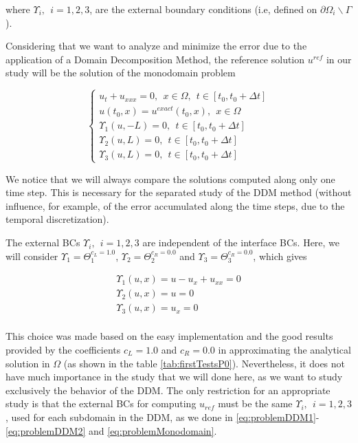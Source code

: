 \noindent where $ \Upsilon_i, \ \ i=1,2,3$, are the external boundary conditions (i.e, defined on $\partial \Omega_i \backslash \Gamma$).

\indent Considering that we want to analyze and minimize the error due to the application of a Domain Decomposition Method, the reference solution $u^{ref}$ in our study will be the solution of the monodomain problem

\begin{equation}
	\label{eq:problemMonodomain}
	\begin{cases}
	u_t + u_{xxx} = 0, \ \ x \in \Omega, \ \ t \in [t_0, t_0+\Delta t] \\
	u(t_0,x) = u^{exact}(t_0,x) , \ \ x \in \Omega \\ 
	\Upsilon_1(u,-L) = 0, \ \ t \in [t_0, t_0+\Delta t] \\
	\Upsilon_2(u,L) = 0, \ \ t \in [t_0, t_0+\Delta t] \\
	\Upsilon_3(u,L) = 0, \ \ t \in [t_0, t_0+\Delta t]
	\end{cases}
\end{equation}
	
\indent We notice that we will always compare the solutions computed along only one time step. This is necessary for the separated study of the DDM method (without influence, for example, of the error accumulated along the time steps, due to the temporal discretization).

\indent The external BCs $ \Upsilon_i, \ \ i=1,2,3$ are independent of the interface BCs. Here, we will consider $\Upsilon_1 = \Theta_1^{c_L = 1.0}$, $\Upsilon_2 = \Theta_2^{c_R = 0.0}$ and $\Upsilon_3 = \Theta_3^{c_R = 0.0}$, which gives

\begin{equation}
	\label{eq:externalBCsDDM}
	\begin{gathered}
	\Upsilon_1(u,x) = u - u_x + u_{xx} = 0\\
	\Upsilon_2(u,x) = u = 0\\
	\Upsilon_3(u,x) = u_x = 0\\
	\end{gathered}
\end{equation}

\indent This choice was made based on the easy implementation and the good results provided by the coefficients $c_L = 1.0$ and $c_R = 0.0$ in approximating the analytical solution in $\Omega$ (as shown in the table \ref{tab:firstTestsP0}). Nevertheless, it does not have much importance in the study that we will done here, as we want to study exclusively the behavior of the DDM. The only restriction for an appropriate study is that the external BCs for computing $u_{ref}$ must be the same $\Upsilon_i, \ \ i=1,2,3$, used for each subdomain in the DDM, as we done in \eqref{eq:problemDDM1}-\eqref{eq:problemDDM2} and \eqref{eq:problemMonodomain}.

